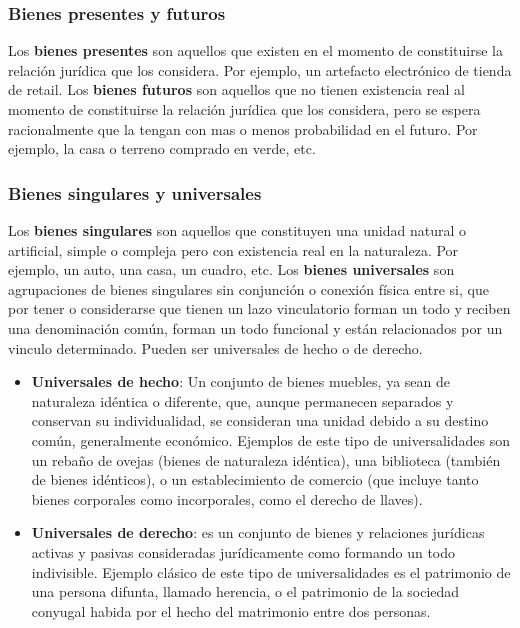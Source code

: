 \documentclass{templateNote}
\begin{document}
\subsubsection*{Bienes presentes y futuros}
Los \textbf{bienes presentes} son aquellos que existen en el momento de constituirse la relación jurídica que los considera. Por ejemplo, un artefacto electrónico de tienda de retail.
Los \textbf{bienes futuros} son aquellos que no tienen existencia real al momento de constituirse la relación jurídica que los considera, pero se espera racionalmente que la tengan con mas o menos probabilidad en el futuro. Por ejemplo, la casa o terreno comprado en verde, etc. 

\subsubsection*{Bienes singulares y universales}
Los \textbf{bienes singulares} son aquellos que constituyen una unidad natural o artificial, simple o compleja pero con existencia real en la naturaleza. Por ejemplo, un auto, una casa, un cuadro, etc.
Los \textbf{bienes universales} son agrupaciones de bienes singulares sin conjunción o conexión física entre si, que por tener o considerarse que tienen un lazo vinculatorio forman un todo y reciben una denominación común, forman un todo funcional y están relacionados por un vinculo determinado. Pueden ser universales de hecho o de derecho. 

\begin{itemize}
    \item \textbf{Universales de hecho}: Un conjunto de bienes muebles, ya sean de naturaleza idéntica o diferente, que, aunque permanecen separados y conservan su individualidad, se consideran una unidad debido a su destino común, generalmente económico. Ejemplos de este tipo de universalidades son un rebaño de ovejas (bienes de naturaleza idéntica), una biblioteca (también de bienes idénticos), o un establecimiento de comercio (que incluye tanto bienes corporales como incorporales, como el derecho de llaves).
    \item \textbf{Universales de derecho}: es un conjunto de bienes y relaciones jurídicas activas y pasivas consideradas jurídicamente como formando un todo indivisible. Ejemplo clásico de este tipo de universalidades es el patrimonio de una persona difunta, llamado herencia, o el patrimonio de la sociedad conyugal habida por el hecho del matrimonio entre dos personas. 
\end{itemize}
\end{document}

